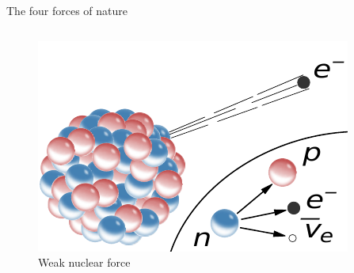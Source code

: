 \documentclass[10pt,show notes on second screen]{beamer}
\begin{document}
\begin{frame}{The four forces of nature}
\begin{columns}
\begin{minipage}[b][0.45\textheight][b]{\linewidth}
{\begin{figure}
            \includegraphics[width=0.6\linewidth]{../figures/weakforce_pdf}
            \captionsetup{labelformat=empty}
            \caption{Weak nuclear force}
        \end{figure}}
    \end{minipage}
    \begin{minipage}[b][0.45\textheight][b]{\linewidth}
        \centering
    \end{minipage}
\end{columns}
\end{frame}
\end{document}
